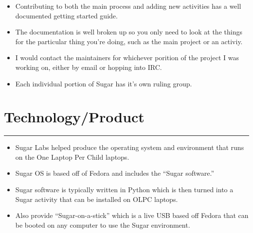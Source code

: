 \begin{itemize}
\itemsep1pt\parskip0pt
\item
  Contributing to both the main process and adding new activities has a
  well documented getting started guide.
\item
  The documentation is well broken up so you only need to look at the
  things for the particular thing you're doing, such as the main project
  or an activiy.
\item
  I would contact the maintainers for whichever porition of the project
  I was working on, either by email or hopping into IRC.
\item
  Each individual portion of Sugar has it's own ruling group.
\end{itemize}

\section{Technology/Product}\label{technologyproduct}

\begin{center}\rule{3in}{0.4pt}\end{center}

\begin{itemize}
\itemsep1pt\parskip0pt
\item
  Sugar Labs helped produce the operating system and environment that
  runs on the One Laptop Per Child laptops.
\item
  Sugar OS is based off of Fedora and includes the ``Sugar software.''
\item
  Sugar software is typically written in Python which is then turned
  into a Sugar activity that can be installed on OLPC laptops.
\item
  Also provide ``Sugar-on-a-stick'' which is a live USB based off Fedora
  that can be booted on any computer to use the Sugar environment.
\end{itemize}
